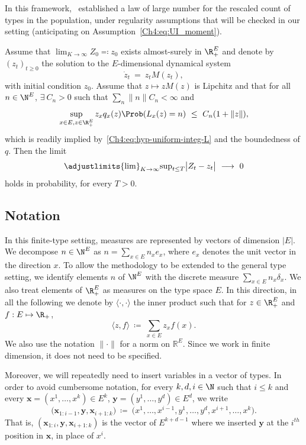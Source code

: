 \begin{refsegment}
In this framework,~\cite{Kurtz:1978aa} established a law of large number for the rescaled count of types in the population, under regularity assumptions that will be checked in our setting (anticipating on Assumption~\ref{Ch4:eq:UI_moment}).
\begin{prop}{\citet[Theorem~2.2]{Kurtz:1978aa}}\label{Ch4:prop:kurtz}
  Assume that $\lim_{K\to\infty}Z_0\eqqcolon z_0$ exists almost-surely in $\R_+^E$ and denote by
  $(z_t)_{t\geq 0}$ the solution to the $E$-dimensional dynamical system 
  \begin{equation}\label{Ch4:eq:mean_dynamical_system}
\dot z_t\ =\ z_t M(z_t),
\end{equation}
with initial condition $z_0$.
Assume that $z\mapsto zM(z)$ is Lipchitz and that for all $n\in\N^E$, $\exists\ C_n>0$ such that $\sum_n \lVert n\rVert C_n<\infty$ and
\[
\sup_{x\in E, z\in \R_+^E} z_x q_x(z) \Prob(L_x(z)=n)\ \leq\ C_n(1+ \lVert z\rVert),
\]
which is readily implied by~\eqref{Ch4:eq:hyp-uniform-integ-L} and the boundedness of $q$. Then the limit
\[
\adjustlimits{\lim}_{K\to\infty}{\sup}_{t\leq T} \big|Z_t-z_t\big| \ \longrightarrow\ 0
\]
holds in probability, for every $T>0$.
\end{prop}

\subsection{Notation}
In this finite-type setting, measures are represented by vectors of dimension $|E|$. We decompose $n\in \N^E$ as $n=\sum_{x\in E}n_x e_x$, where $e_x$ denotes the unit vector in the direction $x$. To allow the methodology to be extended to the general type setting, we identify elements $n$ of $\N^E$ with the discrete measure $\sum_{x\in E} n_x \delta_x$. We also treat elements of $\R_+^E$ as measures on the type space $E$.
In this direction, in all the following we denote by $\langle \cdot, \cdot\rangle$ the inner product such that for $z\in \R_+^E$ and $f:E\mapsto \R_+$,
\[ \langle z, f\rangle \ \coloneqq\ \sum_{x\in E} z_x f(x). \] 
We also use the notation
$\lVert \cdot \rVert$ for a norm on $\mathbb{R}^E$. Since we work in finite dimension, it does not need to be specified.

Moreover, we will repeatedly need to insert variables in a vector of types. In order to avoid cumbersome notation, for every $k,d,i\in \N$ such that $i\leq k$ and every $\bm x = (x^1,\ldots, x^k)\in E^k$, $\bm y = (y^1,\ldots, y^d)\in E^d$, we write 
\begin{equation}\label{Ch4:eq:insertion}
\big(\bm{x}_{1:i-1}, \bm y, \bm{x}_{i+1:k}\big)\ \coloneqq\ \big(x^1,\ldots, x^{i-1}, y^1,\ldots, y^d, x^{i+1},\ldots, x^k\big).
\end{equation}
That is, $(\bm{x}_{1:i}, \bm y, \bm{x}_{i+1:k})$ is the vector of $E^{k+d-1}$ where we inserted $\bm y$ at the $i^{th}$ position in $\bm x$, in place of $x^i$.


\end{refsegment}
